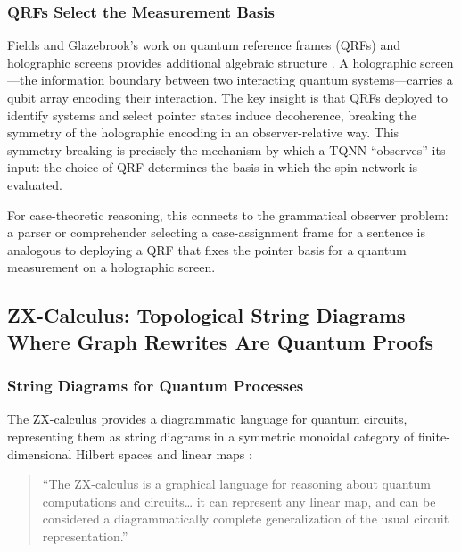 \documentclass[
]{article}
\begin{document}
\subsubsection{QRFs Select the Measurement
Basis}\label{qrfs-select-the-measurement-basis}

Fields and Glazebrook's work on quantum reference frames (QRFs) and
holographic screens provides additional algebraic structure
\citep{fields2021qrf}. A holographic screen---the information boundary
between two interacting quantum systems---carries a qubit array encoding
their interaction. The key insight is that QRFs deployed to identify
systems and select pointer states induce decoherence, breaking the
symmetry of the holographic encoding in an observer-relative way. This
symmetry-breaking is precisely the mechanism by which a TQNN
``observes'' its input: the choice of QRF determines the basis in which
the spin-network is evaluated.

For case-theoretic reasoning, this connects to the grammatical observer
problem: a parser or comprehender selecting a case-assignment frame for
a sentence is analogous to deploying a QRF that fixes the pointer basis
for a quantum measurement on a holographic screen.

\subsection{ZX-Calculus: Topological String Diagrams Where Graph
Rewrites Are Quantum
Proofs}\label{zx-calculus-topological-string-diagrams-where-graph-rewrites-are-quantum-proofs}

\subsubsection{String Diagrams for Quantum
Processes}\label{string-diagrams-for-quantum-processes}

The ZX-calculus provides a diagrammatic language for quantum circuits,
representing them as string diagrams in a symmetric monoidal category of
finite-dimensional Hilbert spaces and linear maps
\citep{kissinger2020zx}:

\begin{quote}
``The ZX-calculus is a graphical language for reasoning about quantum
computations and circuits\ldots{} it can represent any linear map, and
can be considered a diagrammatically complete generalization of the
usual circuit representation.'' \citep{coeckekissinger2017}
\end{quote}
\end{document}
